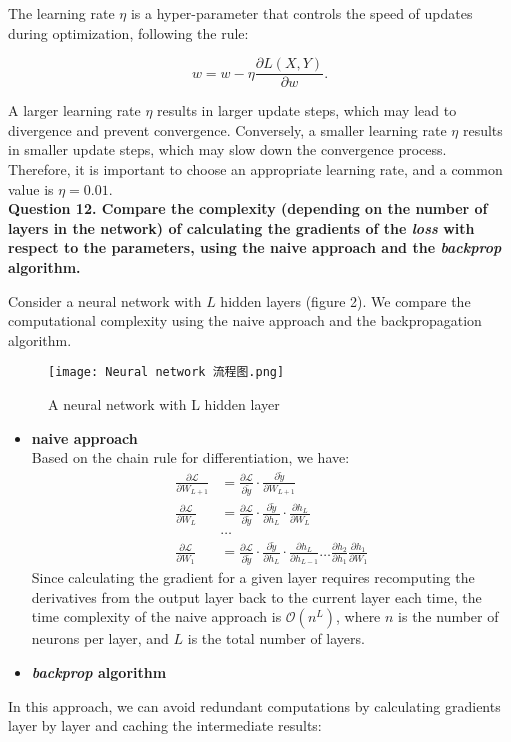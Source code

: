 \documentclass{article}
\begin{document}
The learning rate \(\eta\) is a hyper-parameter that controls the speed of updates during optimization, following the rule:

\[
w = w - \eta \frac{\partial L(X, Y)}{\partial w}.
\]

A larger learning rate \(\eta\) results in larger update steps, which may lead to divergence and prevent convergence. Conversely, a smaller learning rate \(\eta\) results in smaller update steps, which may slow down the convergence process. Therefore, it is important to choose an appropriate learning rate, and a common value is \(\eta = 0.01\).\\

\noindent \textbf{Question 12. Compare the complexity (depending on the number of layers in the network) of calculating the gradients of the \textit{loss} with respect to the parameters, using the naive approach and the \textit{backprop} algorithm.}

Consider a neural network with \(L\) hidden layers (figure 2). We compare the computational complexity using the naive approach and the backpropagation algorithm. 

\begin{figure}[H] 
    \centering
    \texttt{[image: Neural network 流程图.png]}
    \caption{A neural network with L hidden layer}
    \label{fig:figure 2}
\end{figure}

\begin{itemize}
    \item \textbf{naive approach}\\
Based on the chain rule for differentiation, we have: 
\begin{align*}
\frac{\partial\mathcal {L}}{\partial W_{L+1}} 
&= \frac{\partial\mathcal {L}}{\partial \tilde{y}} \cdot\frac{\partial\tilde{y}}{\partial W_{L+1}}\\
\frac{\partial \mathcal{L}}{\partial W_{L}}
&= \frac{\partial\mathcal {L}}{\partial \tilde{y}}\cdot
\frac{\partial\tilde{y}}{\partial h_{L}}\cdot
\frac{\partial h_{L}}{\partial W_{L}}\\
&\dots\\
\frac{\partial \mathcal{L}}{\partial W_{1}}
&= \frac{\partial\mathcal {L}}{\partial \tilde{y}}\cdot
\frac{\partial\tilde{y}}{\partial h_{L}}\cdot
\frac{\partial h_{L}}{\partial h_{L-1}}\dots
\frac{\partial h_{2}}{\partial h_{1}}
\frac{\partial h_{1}}{\partial W_{1}}
\end{align*}
Since calculating the gradient for a given layer requires recomputing the derivatives from the output layer back to the current layer each time, the time complexity of the naive approach is  \(\mathcal{O}(n^L)\), where \(n\) is the number of neurons per layer, and \(L\) is the total number of layers.
    \item \textbf{\textit{backprop} algorithm}
\end{itemize}
In this approach, we can avoid redundant computations by calculating gradients layer by layer and caching the intermediate results: 
\end{document}
